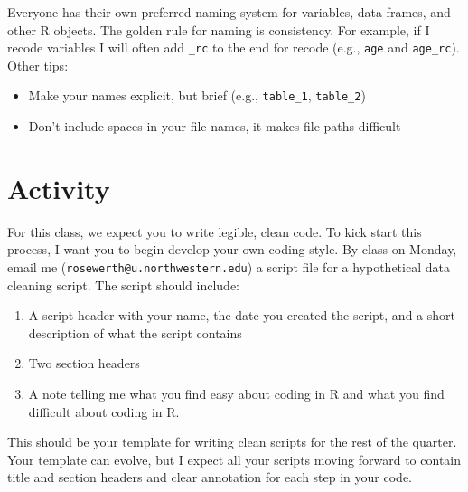 \documentclass[
]{book}
\providecommand{\tightlist}{%
  \setlength{\itemsep}{0pt}\setlength{\parskip}{0pt}}
\begin{document}
Everyone has their own preferred naming system for variables, data frames, and other R objects. The golden rule for naming is consistency. For example, if I recode variables I will often add \texttt{\_rc} to the end for recode (e.g., \texttt{age} and \texttt{age\_rc}). Other tips:

\begin{itemize}
\tightlist
\item
  Make your names explicit, but brief (e.g., \texttt{table\_1}, \texttt{table\_2})
\item
  Don't include spaces in your file names, it makes file paths difficult
\end{itemize}

\hypertarget{activity-1}{%
\section{Activity}\label{activity-1}}

For this class, we expect you to write legible, clean code. To kick start this process, I want you to begin develop your own coding style. By class on Monday, email me (\texttt{rosewerth@u.northwestern.edu}) a script file for a hypothetical data cleaning script. The script should include:

\begin{enumerate}
\def\labelenumi{\arabic{enumi})}
\tightlist
\item
  A script header with your name, the date you created the script, and a short description of what the script contains
\item
  Two section headers
\item
  A note telling me what you find easy about coding in R and what you find difficult about coding in R.
\end{enumerate}

This should be your template for writing clean scripts for the rest of the quarter. Your template can evolve, but I expect all your scripts moving forward to contain title and section headers and clear annotation for each step in your code.

  
\end{document}
